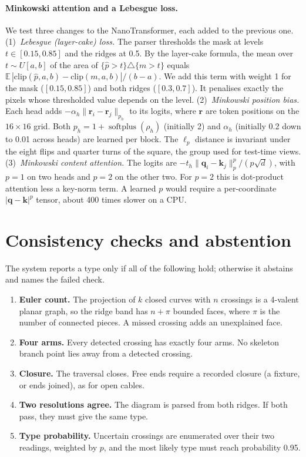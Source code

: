 \paragraph{Minkowski attention and a Lebesgue loss.} We test three changes to the
NanoTransformer, each added to the previous one.
(1)~\emph{Lebesgue (layer-cake) loss.} The parser thresholds the mask at levels
$t\in[0.15,0.85]$ and the ridges at 0.5. By the layer-cake formula, the mean over
$t\sim U[a,b]$ of the area of $\{\hat p>t\}\triangle\{m>t\}$ equals
$\mathbb E\,|\mathrm{clip}(\hat p,a,b)-\mathrm{clip}(m,a,b)|/(b-a)$. We add this term with weight 1
for the mask ($[0.15,0.85]$) and both ridges ($[0.3,0.7]$). It penalises exactly the pixels
whose thresholded value depends on the level.
(2)~\emph{Minkowski position bias.} Each head adds $-\alpha_h\|\mathbf r_i-\mathbf r_j\|_{p_h}$ to
its logits, where $\mathbf r$ are token positions on the $16\times16$ grid. Both
$p_h=1+\operatorname{softplus}(\rho_h)$ (initially 2) and $\alpha_h$ (initially 0.2 down to 0.01
across heads) are learned per block. The $\ell_p$ distance is invariant under the eight flips and
quarter turns of the square, the group used for test-time views.
(3)~\emph{Minkowski content attention.} The logits are
$-t_h\|\mathbf q_i-\mathbf k_j\|_p^p/(p\sqrt d)$, with $p=1$ on two heads and $p=2$ on the other
two. For $p=2$ this is dot-product attention less a key-norm term. A learned $p$ would require
a per-coordinate $|\mathbf q-\mathbf k|^p$ tensor, about 400 times slower on a CPU.

\section{Consistency checks and abstention}\label{sec:gates}
The system reports a type only if all of the following hold; otherwise it abstains
and names the failed check.
\begin{enumerate}
\item \textbf{Euler count.} The projection of $k$ closed curves with $n$ crossings is a
  4-valent planar graph, so the ridge band has $n+\pi$ bounded faces, where $\pi$ is
  the number of connected pieces. A missed crossing adds an unexplained face.
\item \textbf{Four arms.} Every detected crossing has exactly four arms. No skeleton
  branch point lies away from a detected crossing.
\item \textbf{Closure.} The traversal closes. Free ends require a recorded closure
  (a fixture, or ends joined), as for open cables.
\item \textbf{Two resolutions agree.} The diagram is parsed from both ridges. If both
  pass, they must give the same type.
\item \textbf{Type probability.} Uncertain crossings are enumerated over their two
  readings, weighted by $p$, and the most likely type must reach probability 0.95.
\end{enumerate}
